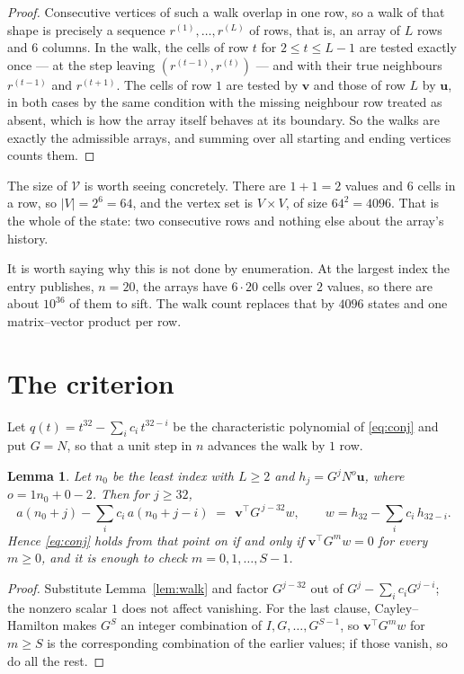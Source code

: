 \documentclass[11pt,a4paper]{article}
\theoremstyle{plain}
\newtheorem{lemma}[theorem]{Lemma}
\theoremstyle{definition}
\begin{document}
\begin{proof}
Consecutive vertices of such a walk overlap in one row, so a walk of that shape is
precisely a sequence $r^{(1)},\dots,r^{(L)}$ of rows, that is, an array of $L$ rows
and $6$ columns. In the walk, the cells of row $t$ for $2\le t\le L-1$ are tested
exactly once --- at the step leaving $(r^{(t-1)},r^{(t)})$ --- and with their true
neighbours $r^{(t-1)}$ and $r^{(t+1)}$. The cells of row $1$ are tested by
$\mathbf{v}$ and those of row $L$ by $\mathbf{u}$, in both cases by the same condition
with the missing neighbour row treated as absent, which is how the array itself behaves at
its boundary. So the walks are exactly the admissible arrays, and summing over all starting
and ending vertices counts them.
\end{proof}


The size of $\mathcal V$ is worth seeing concretely. There are $1+1=2$ values
and $6$ cells in a row, so $|V|=2^{6}=64$, and the vertex set is
$V\times V$, of size $64^2=4096$. That is the whole of the state: two consecutive
rows and nothing else about the array's history.

It is worth saying why this is not done by enumeration. At the largest index the entry
publishes, $n=20$, the arrays have $6\cdot20$ cells over
$2$ values, so there are about $10^{36}$ of them to sift. The
walk count replaces that by $4096$ states and one matrix--vector product per row.
\section{The criterion}

Let $q(t)=t^{32}-\sum_i c_i\,t^{32-i}$ be the characteristic polynomial of
\eqref{eq:conj} and put $G=N$, so that a unit step in $n$ advances the walk by
$1$ row.

\begin{lemma}\label{lem:crit}
Let $n_0$ be the least index with $L\ge2$ and $h_j=G^{j}N^{o}\mathbf{u}$, where
$o=1n_0+0-2$. Then for $j\ge32$,
\[
a(n_0+j)-\sum_i c_i\,a(n_0+j-i)\;=\;\,\mathbf{v}^{\!\top}G^{\,j-32}w,
\qquad w=h_{32}-\sum_i c_i\,h_{32-i} .
\]
Hence \eqref{eq:conj} holds from that point on if and only if
$\mathbf{v}^{\!\top}G^{m}w=0$ for every $m\ge0$, and it is enough to check
$m=0,1,\dots,S-1$.
\end{lemma}

\begin{proof}
Substitute Lemma~\ref{lem:walk} and factor $G^{j-32}$ out of
$G^{j}-\sum_ic_iG^{j-i}$; the nonzero scalar $1$ does not affect
vanishing. For the last clause, Cayley--Hamilton makes $G^{S}$ an integer combination of
$I,G,\dots,G^{S-1}$, so $\mathbf{v}^{\!\top}G^{m}w$ for $m\ge S$ is the corresponding
combination of the earlier values; if those vanish, so do all the rest.
\end{proof}
\end{document}
